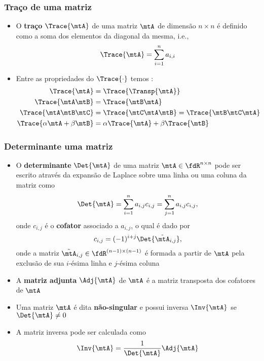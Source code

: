 \begin{frame}
  \frametitle{Traço de uma matriz}
  \begin{itemize}
    \item O \textbf{\alert{traço}} $\Trace{\mtA}$ de uma matriz $\mtA$ de dimensão $n \times n$ é definido como a soma dos elementos da diagonal da mesma, i.e.,
    \begin{equation}\label{eq_trace}
      \Trace{\mtA} = \sum\limits_{i=1}^n a_{i,i}
    \end{equation}
    \item Entre as propriedades do $\Trace{\cdot}$ temos \cite{Petersen2008}:
    \begin{subequations}
      \begin{align}
        \Trace{\mtA} &= \Trace{\Transp{\mtA}} \\
        \Trace{\mtA\mtB} &= \Trace{\mtB\mtA} \\
        \Trace{\mtA\mtB\mtC} &= \Trace{\mtC\mtA\mtB} = \Trace{\mtB\mtC\mtA} \\
        \Trace{\alpha\mtA + \beta\mtB} &= \alpha\Trace{\mtA} + \beta\Trace{\mtB}
      \end{align}
    \end{subequations}
  \end{itemize}
\end{frame}

\begin{frame}
  \frametitle{Determinante uma matriz}
  \begin{itemize}\small
    \item O \textbf{\alert{determinante}} $\Det{\mtA}$ de uma matriz $\mtA \in \fdR^{n\times n}$ pode ser escrito através da \alert{expansão de Laplace} sobre uma linha ou uma coluna da matriz como
    \begin{equation}\label{eq_det}
      \Det{\mtA} = \sum\limits_{i = 1}^n a_{i,j}c_{i,j} = \sum\limits_{j = 1}^n a_{i,j}c_{i,j},
    \end{equation}
    onde $c_{i,j}$ é o \textbf{\alert{cofator}} associado a $a_{i,j}$, o qual é dado por
    \begin{equation}\label{eq_cofactor}
      c_{i,j} = (-1)^{i+j}\Det{\tilde{\mtA}_{i,j}},
    \end{equation}
    onde a matriz $\tilde{\mtA}_{i,j} \in \fdR^{(n-1)\times(n-1)}$ é formada a partir de $\mtA$ pela exclusão de sua $i$-ésima linha e $j$-ésima coluna
    \item A \textbf{\alert{matriz adjunta}} $\Adj{\mtA}$ de $\mtA$ é a matriz transposta dos cofatores de $\mtA$
    \item Uma matriz $\mtA$ é dita \textbf{\alert{não-singular}} e possui inversa $\Inv{\mtA}$ se $\Det{\mtA} \neq 0$
    \item A matriz inversa pode ser calculada como
    \begin{equation}\label{eq_adjoint}
      \Inv{\mtA} = \frac{1}{\Det{\mtA}}\Adj{\mtA}
    \end{equation}
  \end{itemize}
\end{frame}

